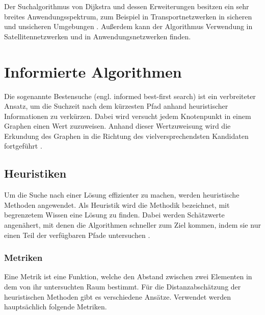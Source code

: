 Der Suchalgorithmus von Dijkstra und dessen Erweiterungen besitzen ein sehr breites Anwendungsspektrum, zum Beispiel in Transportnetzwerken in sicheren \cite{BAN17} und unsicheren Umgebungen \cite{DCZM12}. Außerdem kann der Algorithmus Verwendung in Satellitennetzwerken \cite{HH15} und in Anwendungsnetzwerken \cite{JYA14} finden.

\section{Informierte Algorithmen}
\label{sec:bestsearch}
Die sogenannte Bestensuche (engl. informed best-first search)
ist ein verbreiteter Ansatz, um die Suchzeit nach dem kürzesten Pfad anhand heuristischer Informationen zu verkürzen. Dabei wird versucht jedem Knotenpunkt in einem Graphen einen Wert zuzuweisen. Anhand dieser Wertzuweisung wird die Erkundung des Graphen in die Richtung des vielversprechendsten Kandidaten fortgeführt \cite{RinaDechterandJudeaPearl.1983}.

\subsection{Heuristiken}
Um die Suche nach einer Lösung effizienter zu machen, werden heuristische Methoden angewendet. Als Heuristik wird die Methodik bezeichnet, mit begrenzetem Wissen eine Lösung zu finden. Dabei werden Schätzwerte angenähert, mit denen die Algorithmen schneller zum Ziel kommen, indem sie nur einen Teil der verfügbaren Pfade untersuchen \cite{RinaDechterandJudeaPearl.1983}.

\subsubsection{Metriken}
Eine Metrik ist eine Funktion, welche den Abstand zwischen zwei Elementen in dem von ihr untersuchten Raum bestimmt. Für die Distanzabschätzung der heuristischen Methoden gibt es verschiedene Ansätze. Verwendet werden hauptsächlich folgende Metriken.

